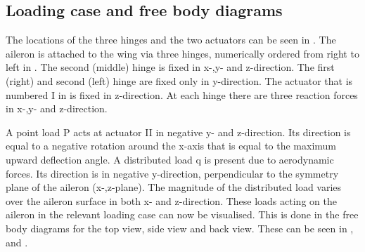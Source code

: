 \subsection{Loading case and free body diagrams}
The locations of the three hinges and the two actuators can be seen in .
The aileron is attached to the wing via three hinges, numerically ordered from right to left in . The second (middle) hinge is fixed in x-,y- and z-direction.
The first (right) and second (left) hinge are fixed only in y-direction.
The actuator that is numbered I in  is fixed in z-direction.
At each hinge there are three reaction forces in x-,y- and z-direction.
\par
A point load P acts at actuator II in negative y- and z-direction. Its direction is equal to a negative rotation around the x-axis that is equal to the maximum upward deflection angle. 
A distributed load q is present due to aerodynamic forces. Its direction is in negative y-direction, perpendicular to the symmetry plane of the aileron (x-,z-plane). The magnitude of the distributed load varies over the aileron surface in both x- and z-direction. 
These loads acting on the aileron in the relevant loading case can now be visualised. This is done in the free body diagrams for the top view, side view and back view. These can be seen in ,  and .
\par
